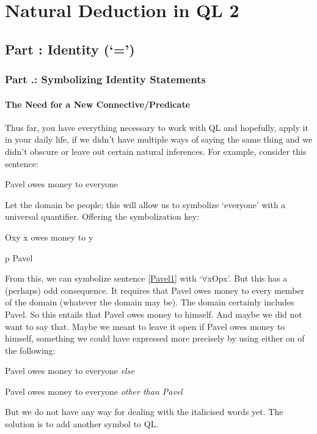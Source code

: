 \part{Natural Deduction in QL 2}
\label{ch.qlnd2}
\setcounter{seccount}{1}
\chapter{Part \thechapcount: Identity (‘=')}
\section{Part \thechapcount.\theseccount: Symbolizing Identity Statements}
\subsection{The Need for a New Connective/Predicate}

Thus far, you have everything necessary to work with QL and hopefully, apply it in your daily life, if we didn't have multiple ways of saying the same thing and we didn't obscure or leave out certain natural inferences. For example, consider this sentence:
\begin{earg}
\item[\ex{Pavel1}] Pavel owes money to everyone
\end{earg}
Let the domain be people; this will allow us to symbolize ‘everyone’ with a universal quantifier. Offering the symbolization key:
\begin{ekey}
\item[Oxy] x owes money to y
\item[p] Pavel
\end{ekey}
From this, we can symbolize sentence \ref{Pavel1} with ‘$\forall$xOpx’. But this has a (perhaps) odd consequence. It requires that Pavel owes money to every member of the domain (whatever the domain may be). The domain certainly includes Pavel. So this entails that Pavel owes money to himself. And maybe we did not want to say that. Maybe we meant to leave it open if Pavel owes money to himself, something we could have expressed more precisely by using either on of the following:
\begin{earg}
\item[\ex{Pavel2}] Pavel owes money to everyone \emph{else}
\item[\ex{Pavel3}] Pavel owes money to everyone \emph{other than Pavel}
\end{earg}
But we do not have any way for dealing with the italicised words yet. The solution is to add another symbol to QL.
